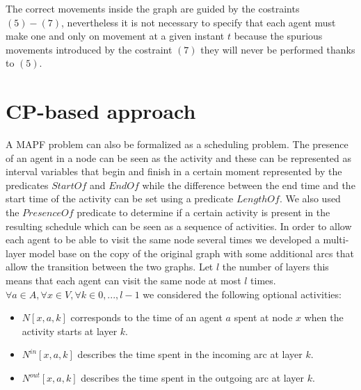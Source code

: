 \documentclass[12pt, a4paper, hidelinks]{article}
\begin{document}
The correct movements inside the graph are guided by the costraints $(5)-(7)$, nevertheless it is not necessary to specify that each agent must make one and only on movement at a given instant $t$ because the spurious movements introduced by the costraint $(7)$ they will never be performed thanks to $(5)$.

\section{CP-based approach}

A MAPF problem can also be formalized as a scheduling problem. The presence of an agent in a node can be seen as the activity and these can be represented as interval variables that begin and finish in a certain moment represented by the predicates $StartOf$ and $EndOf$ while the difference between the end time and the start time of the activity can be set using a predicate $LengthOf$. We also used the $PresenceOf$ predicate to determine if a certain activity is present in the resulting schedule which can be seen as a sequence of activities. In order to allow each agent to be able to visit the same node several times we developed a multi-layer model  base on the copy of the original graph with some additional arcs that allow the transition between the two graphs. Let $l$ the number of layers this means that each agent can visit the same node at most $l$ times.
$\forall a \in A, \forall x \in V, \forall k \in {0,...,l-1}$ we considered the following optional activities:
\begin{itemize}
\item $N[x,a,k]$ corresponds to the time of an agent $a$ spent at node $x$ when the activity starts at layer $k$.
\item $N^{in}[x,a,k]$ describes the time spent in the incoming arc at layer $k$.
\item $N^{out}[x,a,k]$ describes the time spent in the outgoing arc at layer $k$.
\end{itemize}
\end{document}
